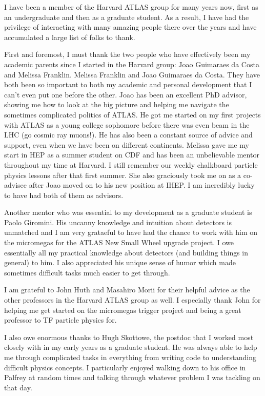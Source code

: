 
I have been a member of the Harvard ATLAS group for many years now, first as an undergraduate and then as a graduate student. As a result, I have had the privilege of interacting with many amazing people there over the years and have accumulated a large list of folks to thank. 

First and foremost, I must thank the two people who have effectively been my academic parents since I started in the Harvard group: Joao Guimaraes da Costa and Melissa Franklin. Melissa Franklin and Joao Guimaraes da Costa. They have both been so important to both my academic and personal development that I can't even put one before the other. Joao has been an excellent PhD advisor, showing me how to look at the big picture and helping me navigate the sometimes complicated politics of ATLAS. He got me started on my first projects with ATLAS as a young college sophomore before there was even beam in the LHC (go cosmic ray muons!). He has also been a constant source of advice and support, even when we have been on different continents. Melissa gave me my start in HEP as a summer student on CDF and has been an unbelievable mentor throughout my time at Harvard. I still remember our weekly chalkboard particle physics lessons after that first summer. She also graciously took me on as a co-advisee after Joao moved on to his new position at IHEP. I am incredibly lucky to have had both of them as advisors. 

Another mentor who was essential to my development as a graduate student is Paolo Giromini. His uncanny knowledge and intuition about detectors is unmatched and I am very grataeful to have had the chance to work with him on the micromegas for the ATLAS New Small Wheel upgrade project. I owe essentially all my practical knowledge about detectors (and building things in general) to him. I also appreciated his unique sense of humor which made sometimes difficult tasks much easier to get through.

I am grateful to John Huth and Masahiro Morii for their helpful advice as the other professors in the Harvard ATLAS group as well. I especially thank John for helping me get started on the micromegas trigger project and being a great professor to TF particle physics for. 

I also owe enormous thanks to Hugh Skottowe, the postdoc that I worked most closely with in my early years as a graduate student. He was always able to help me through complicated tasks in everything from writing code to understanding difficult physics concepts. I particularly enjoyed walking down to his office in Palfrey at random times and talking through whatever problem I was tackling on that day. 

